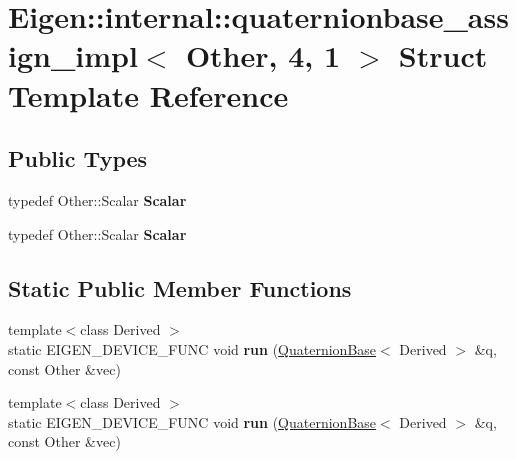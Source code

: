 \hypertarget{struct_eigen_1_1internal_1_1quaternionbase__assign__impl_3_01_other_00_014_00_011_01_4}{}\section{Eigen\+:\+:internal\+:\+:quaternionbase\+\_\+assign\+\_\+impl$<$ Other, 4, 1 $>$ Struct Template Reference}
\label{struct_eigen_1_1internal_1_1quaternionbase__assign__impl_3_01_other_00_014_00_011_01_4}
\subsection*{Public Types}
\begin{DoxyCompactItemize}
\item 
\mbox{\label{struct_eigen_1_1internal_1_1quaternionbase__assign__impl_3_01_other_00_014_00_011_01_4_ac30752718f970b7ba76e0fcceb30bf49}} 
typedef Other\+::\+Scalar {\bfseries Scalar}
\item 
\mbox{\label{struct_eigen_1_1internal_1_1quaternionbase__assign__impl_3_01_other_00_014_00_011_01_4_ac30752718f970b7ba76e0fcceb30bf49}} 
typedef Other\+::\+Scalar {\bfseries Scalar}
\end{DoxyCompactItemize}
\subsection*{Static Public Member Functions}
\begin{DoxyCompactItemize}
\item 
\mbox{\label{struct_eigen_1_1internal_1_1quaternionbase__assign__impl_3_01_other_00_014_00_011_01_4_a95a77633cabbb3f056d8869d37319163}} 
{\footnotesize template$<$class Derived $>$ }\\static E\+I\+G\+E\+N\+\_\+\+D\+E\+V\+I\+C\+E\+\_\+\+F\+U\+NC void {\bfseries run} (\hyperlink{group___geometry___module_class_eigen_1_1_quaternion_base}{Quaternion\+Base}$<$ Derived $>$ \&q, const Other \&vec)
\item 
\mbox{\label{struct_eigen_1_1internal_1_1quaternionbase__assign__impl_3_01_other_00_014_00_011_01_4_a95a77633cabbb3f056d8869d37319163}} 
{\footnotesize template$<$class Derived $>$ }\\static E\+I\+G\+E\+N\+\_\+\+D\+E\+V\+I\+C\+E\+\_\+\+F\+U\+NC void {\bfseries run} (\hyperlink{group___geometry___module_class_eigen_1_1_quaternion_base}{Quaternion\+Base}$<$ Derived $>$ \&q, const Other \&vec)
\end{DoxyCompactItemize}


